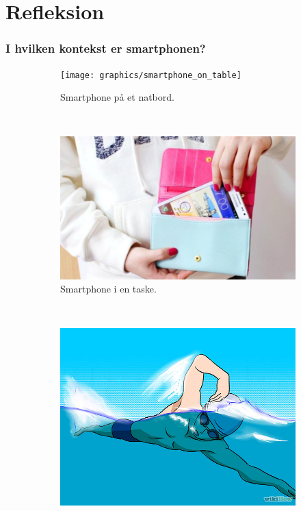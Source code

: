 \section{Refleksion}

\begin{frame}
\frametitle{I hvilken kontekst er smartphonen?}
\begin{figure}
\centering

\begin{minipage}{\textwidth}
        \begin{subfigure}[b]{0.3\textwidth}
                \texttt{[image: graphics/smartphone\_on\_table]}
                \caption{Smartphone på et natbord.}
                \label{context:table}
        \end{subfigure}
        ~ %
        \begin{subfigure}[b]{0.3\textwidth}
                \includegraphics[width=\textwidth]{graphics/smartphone_in_purse}
                \caption{Smartphone i en taske.}
                \label{context:purse}
        \end{subfigure}
        ~ %
        \begin{subfigure}[b]{0.3\textwidth}
                \includegraphics[width=\textwidth]{graphics/swimmer}

\end{subfigure}
\end{minipage}
\end{figure}
\end{frame}
